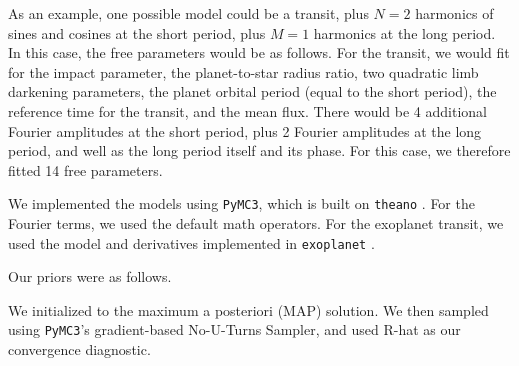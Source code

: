 \documentclass[12pt,twocolumn,tighten]{aastex62}
\begin{document}
As an example, one possible model could be a transit, plus $N=2$
harmonics of sines and cosines at the short period, plus $M=1$
harmonics at the long period.  In this case, the free parameters would
be as follows.  For the transit, we would fit for the impact
parameter, the planet-to-star radius ratio, two quadratic limb
darkening parameters, the planet orbital period (equal to the short
period), the reference time for the transit, and the mean flux.  There
would be 4 additional Fourier amplitudes at the short period, plus 2
Fourier amplitudes at the long period, and well as the long period
itself and its phase.  For this case, we therefore fitted 14 free
parameters.

We implemented the models using \texttt{PyMC3}, which is built on \texttt{theano} \citep{salvatier_2016_PyMC3,exoplanet:theano}.
For the Fourier terms, we used the default math operators.
For the exoplanet transit, we used the model and derivatives implemented in
\texttt{exoplanet} \citep{exoplanet:exoplanet}.

Our priors were as follows.

We initialized to the maximum a posteriori (MAP) solution.
We then sampled using \texttt{PyMC3}'s gradient-based No-U-Turns Sampler, 
and used R-hat as our convergence diagnostic.


% 
% 
\end{document}
